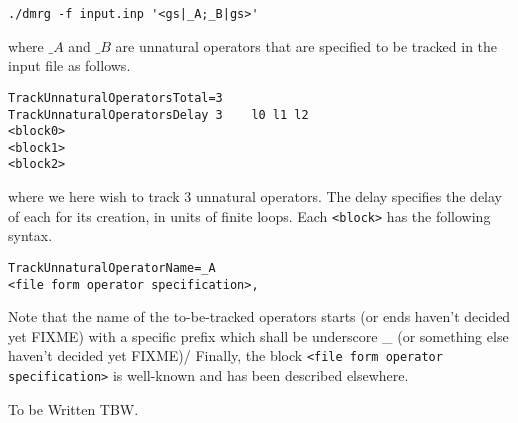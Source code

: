 \documentclass{article}
\begin{document}
\begin{verbatim}
./dmrg -f input.inp '<gs|_A;_B|gs>'
\end{verbatim}
where $\_A$ and $\_B$ are unnatural operators that are specified to be
tracked in the input file as follows.
\begin{verbatim}
TrackUnnaturalOperatorsTotal=3
TrackUnnaturalOperatorsDelay 3    l0 l1 l2
<block0>
<block1>
<block2>
\end{verbatim}
where we here wish to track 3 unnatural operators. 
The delay specifies the delay of each for its creation, in units
of finite loops.
Each \texttt{<block>} has the following syntax.
\begin{verbatim}
TrackUnnaturalOperatorName=_A
<file form operator specification>,
\end{verbatim}
Note that the name of the to-be-tracked operators starts (or ends haven't
decided yet FIXME) with a specific prefix which shall be underscore \_
(or something else haven't
decided yet FIXME)/
Finally, the block \texttt{<file form operator specification>} is well-known
and has been described elsewhere.

To be Written TBW.
\end{document}
